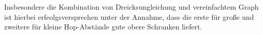 Insbesondere die Kombination von Dreicksungleichung und vereinfachtem Graph ist hierbei erfeolgsversprechen unter der Annahme, dass die erste für große und zweitere für kleine Hop-Abstände gute obere Schranken liefert.

% 
% 
% 
% 
% 
% 
% 
% 

